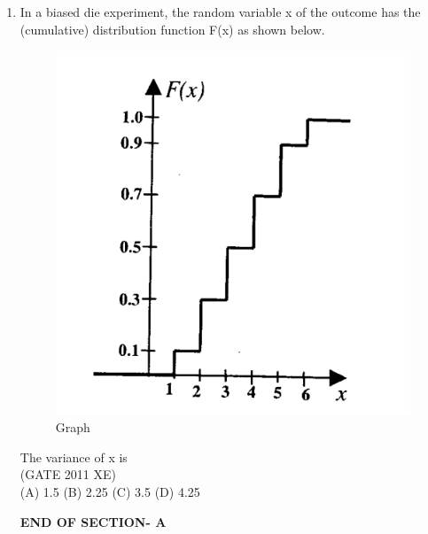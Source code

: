 \documentclass[journal,12pt,onecolumn]{IEEEtran}
\begin{document}
\begin{enumerate}[label=\textbf{Q\arabic*.},itemsep=2em]
\item In a biased die experiment, the random variable x of the outcome has the (cumulative) distribution function F(x) as shown below.

\begin{figure}[htbp]
  \centering
  \includegraphics[width=.6\columnwidth]{figs/A/fig1.png}
  \caption{Graph}
  \label{fig:figs/A/fig1.png}
\end{figure}


The variance of x is\\

\hfill{(GATE 2011 XE)} \\
(A) 1.5 
(B) 2.25 
(C) 3.5   
(D) 4.25   

\vspace{3\baselineskip}
    \begin{center}
    \textbf{\Large END OF SECTION- A}
    \end{center}

\end{enumerate}


\newpage
\end{document}
